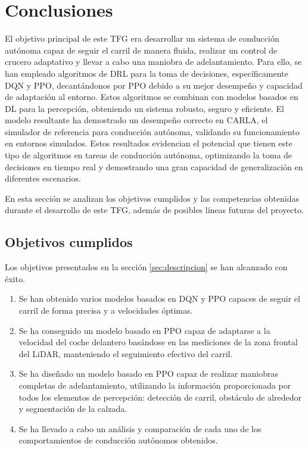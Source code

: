 \chapter{Conclusiones}
\label{cap:capitulo5}

El objetivo principal de este \ac{TFG} era desarrollar un sistema de conducción autónoma capaz de seguir el carril de manera fluida, realizar un control de crucero adaptativo y llevar a cabo una maniobra de adelantamiento. Para ello, se han empleado algoritmos de \ac{DRL} para la toma de decisiones, específicamente \ac{DQN} y \ac{PPO}, decantándonos por PPO debido a su mejor desempeño y capacidad de adaptación al entorno. Estos algoritmos se combinan con modelos basados en \ac{DL} para la percepción, obteniendo un sistema robusto, seguro y eficiente. El modelo resultante ha demostrado un desempeño correcto en CARLA, el simulador de referencia para conducción autónoma, validando su funcionamiento en entornos simulados. Estos resultados evidencian el potencial que tienen este tipo de algoritmos en tareas de conducción autónoma, optimizando la toma de decisiones en tiempo real y demostrando una gran capacidad de generalización en diferentes escenarios.

En esta sección se analizan los objetivos cumplidos y las competencias obtenidas durante el desarrollo de este \ac{TFG}, además de posibles líneas futuras del proyecto.

\section{Objetivos cumplidos}

Los objetivos presentados en la sección \ref{sec:descripcion} se han alcanzado con éxito.

\begin{enumerate}
\item Se han obtenido varios modelos basados en \ac{DQN} y \ac{PPO} capaces de seguir el carril de forma precisa y a velocidades óptimas. 
\item Se ha conseguido un modelo basado en \ac{PPO} capaz de adaptarse a la velocidad del coche delantero basándose en las mediciones de la zona frontal del \ac{LiDAR}, manteniendo el seguimiento efectivo del carril.
\item Se ha diseñado un modelo basado en \ac{PPO} capaz de realizar maniobras completas de adelantamiento, utilizando la información proporcionada por todos los elementos de percepción: detección de carril, obstáculo de alrededor y segmentación de la calzada.
\item Se ha llevado a cabo un análisis y comparación de cada uno de los comportamientos de conducción autónomos obtenidos.
\end{enumerate}

